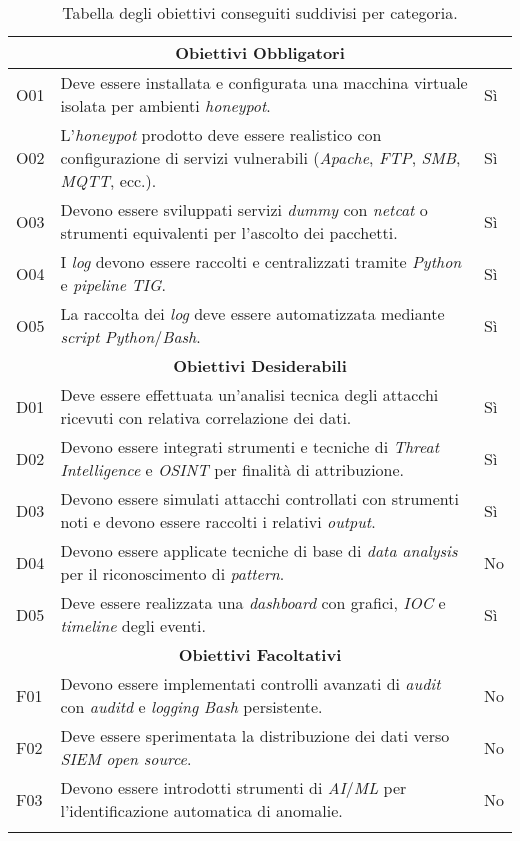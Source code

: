\begin{center}
\begin{longtable}{|p{}|p{}|p{}|}
\multicolumn{3}{|c|}{\textbf{Obiettivi Obbligatori}} \\ \hline
O01 & Deve essere installata e configurata una macchina virtuale isolata per ambienti \textit{honeypot}. & Sì \\ \hline
O02 & L'\textit{honeypot} prodotto deve essere realistico con configurazione di servizi vulnerabili (\textit{Apache}, \textit{FTP}, \textit{SMB}, \textit{MQTT}, ecc.). & Sì \\ \hline
O03 & Devono essere sviluppati servizi \textit{dummy} con \textit{netcat} o strumenti equivalenti per l'ascolto dei pacchetti. & Sì \\ \hline
O04 & I \textit{log} devono essere raccolti e centralizzati tramite \textit{Python} e \textit{pipeline} \textit{TIG}. & Sì \\ \hline
O05 & La raccolta dei \textit{log} deve essere automatizzata mediante \textit{script} \textit{Python}/\textit{Bash}. & Sì \\ \hline

\multicolumn{3}{|c|}{\textbf{Obiettivi Desiderabili}} \\ \hline
D01 & Deve essere effettuata un'analisi tecnica degli attacchi ricevuti con relativa correlazione dei dati. & Sì \\ \hline
D02 & Devono essere integrati strumenti e tecniche di \textit{Threat Intelligence} e \textit{OSINT} per finalità di attribuzione. & Sì \\ \hline
D03 & Devono essere simulati attacchi controllati con strumenti noti e devono essere raccolti i relativi \textit{output}. & Sì \\ \hline
D04 & Devono essere applicate tecniche di base di \textit{data analysis} per il riconoscimento di \textit{pattern}. & No \\ \hline
D05 & Deve essere realizzata una \textit{dashboard} con grafici, \textit{IOC} e \textit{timeline} degli eventi. & Sì \\ \hline

\multicolumn{3}{|c|}{\textbf{Obiettivi Facoltativi}} \\ \hline
F01 & Devono essere implementati controlli avanzati di \textit{audit} con \textit{auditd} e \textit{logging} \textit{Bash} persistente. & No \\ \hline
F02 & Deve essere sperimentata la distribuzione dei dati verso \textit{SIEM} \textit{open source}. & No \\ \hline
F03 & Devono essere introdotti strumenti di \textit{AI}/\textit{ML} per l'identificazione automatica di anomalie. & No \\ \hline

\caption{Tabella degli obiettivi conseguiti suddivisi per categoria.}
\label{tab:obiettivi-soddisfatti}
\end{longtable}
\end{center}
